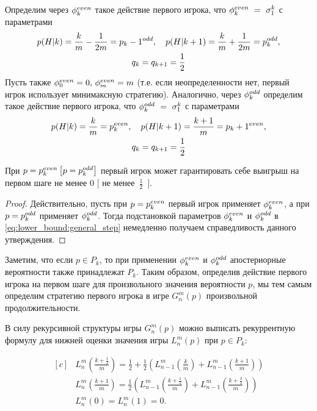 Определим через $ \phi_k^{even} $ такое действие первого игрока, что $ \phi_k^{even}~=~\sigma^k_1 $ с параметрами
\begin{gather*}
  p(H|k) = \frac{k}{m} - \frac{1}{2m} = p_k-1^{odd}, \quad
  p(H|k+1) = \frac{k}{m} + \frac{1}{2m} = p_k^{odd},\\
  q_k = q_{k+1} = \frac{1}{2}
\end{gather*}
Пусть также $ \phi_0^{even} = 0,\, \phi_m^{even} = m $ (т.е. если неопределенности нет, первый игрок использует минимаксную стратегию).
Аналогично, через $ \phi_k^{odd} $ определим такое действие первого игрока, что $ \phi_k^{odd}~=~\sigma^k_1 $ с параметрами
\begin{gather*}
  p(H|k) = \frac{k}{m} = p_k^{even}, \quad
  p(H|k+1) = \frac{k + 1}{m} = p_k+1^{even}, \\
  q_k = q_{k+1} = \frac{1}{2}
\end{gather*}

\begin{utver}
\label{utver:first_player:strategy:extreme_points}
  При $ p = p_k^{even} \left[ p = p_k^{odd} \right] $ первый игрок может гарантировать себе выигрыш на первом шаге не менее $ 0 $ $ [ $ не менее~$ \frac{1}{2} $~$ ] $.
\end{utver}
\begin{proof}
  Действительно, пусть при $ p = p_k^{even} $ первый игрок применяет $ \phi_k^{even} $, а при $ p = p_k^{odd} $ применяет $ \phi_k^{odd} $. Тогда подстановкой параметров $ \phi_k^{even} $ и $ \phi_k^{odd} $ в  \eqref{eq:lower_bound:general_step} немедленно получаем справедливость данного утверждения.
\end{proof}

Заметим, что если $ p \in P_k $, то при применении $ \phi_k^{even} $ и $ \phi_k^{odd} $ апостериорные вероятности также принадлежат $ P_k $.
Таким образом, определив действие первого игрока на первом шаге для произвольного значения вероятности $ p $, мы тем самым определим стратегию первого игрока в игре $ G_n^m(p) $ произвольной продолжительности.

В силу рекурсивной структуры игры $ G_n^m(p) $ можно выписать рекуррентную формулу для нижней оценки значения игры $ L_n^m(p) $ при $ p \in P_k $:

\begin{equation}
\label{eq:lower_bound:recurrence_finite}
\begin{aligned}[c]
&L_n^m\left(\frac{k+\frac{1}{2}}{m}\right) = 
    \frac{1}{2} + \frac{1}{2}\left(
        L_{n-1}^m\left(\frac{k}{m}\right) + 
        L_{n-1}^m\left(\frac{k + 1}{m}\right)
    \right) \\
&L_n^m\left(\frac{k+1}{m}\right) = 
    \frac{1}{2}\left(
        L_{n-1}^m\left(\frac{k+\frac{1}{2}}{m}\right) + 
        L_{n-1}^m\left(\frac{k+\frac{3}{2}}{m}\right)
    \right) \\
&L_n^m(0) = L_n^m(1) = 0.
\end{aligned}
\end{equation}

